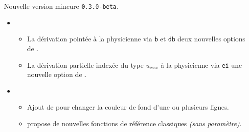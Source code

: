 Nouvelle version mineure \verb+0.3.0-beta+.

\begin{itemize}[itemsep=.5em]
    \item {}
    \begin{itemize}[itemsep=.5em]
        \item La dérivation pointée à la physicienne via \verb+b+ et \verb+db+ deux nouvelles options de .

        \item La dérivation partielle indexée du type $u_{xxx}$ à la physicienne via \verb+ei+ une nouvelle option de .
    \end{itemize}



    \separation


    \item {}
    \begin{itemize}[itemsep=.5em]
        \item Ajout de  pour changer la couleur de fond d'une ou plusieurs lignes.


        \item {} propose de nouvelles fonctions de référence classiques \emph{(sans paramètre)}.
    \end{itemize}



    \separation
\end{itemize}
